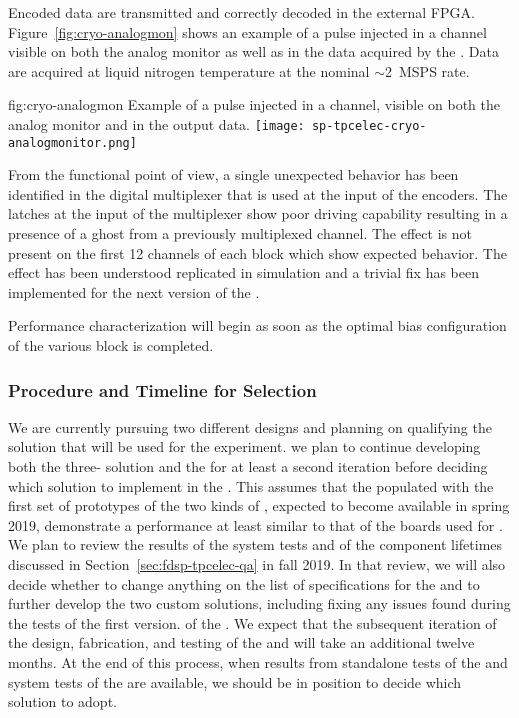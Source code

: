 Encoded data are transmitted and correctly decoded in the external FPGA. Figure~\ref{fig:cryo-analogmon} shows an example of a pulse injected in a channel visible on both the analog monitor as well as in the data acquired by the . Data are acquired at liquid nitrogen temperature at the nominal $\sim$\SI{2}{MSPS} rate.

\begin{dunefigure}
{fig:cryo-analogmon}
{Example of a pulse injected in a   channel, visible on both the analog monitor and in the output data.}
\texttt{[image: sp-tpcelec-cryo-analogmonitor.png]}
\end{dunefigure}

From the functional point of view, a single unexpected behavior has been identified in the digital multiplexer that is used at the input of the encoders. The latches at the input of the multiplexer show poor driving capability resulting in a presence of a ghost from a previously multiplexed channel. The effect is not present on the first 12 channels of each block which show expected behavior. The effect has been understood replicated in simulation and a trivial fix has been implemented for the next version of the .

Performance characterization will begin as soon as the optimal bias configuration of the various block is completed. 

\subsubsection{Procedure and Timeline for  Selection}
\label{sec:fdsp-tpcelec-design-femb-selection}

We are currently pursuing two different  designs and 
planning on qualifying the   solution that 
will be used for the  experiment.
we plan to continue developing both the three- 
solution and the   for at least a second 
iteration before deciding which  solution to 
implement in the  . This assumes that 
the  populated with the first set of prototypes of 
the two kinds of , expected to become available in 
spring 2019, demonstrate a performance at least similar to that 
of the boards used for . We plan to review the results 
of the system tests and of the component lifetimes discussed 
in Section~\ref{sec:fdsp-tpcelec-qa} in fall 2019. 
In that review, we will also decide whether to change anything on 
the list of specifications for the  and to further develop
the two custom  solutions, including fixing any 
issues found during the tests of the first version.  of the . 
We expect that the subsequent iteration
of the design, fabrication, and testing of the  and
 will take an additional twelve months. At the end 
of this process, when results from standalone tests of the
 and system tests of the  are
available, we should be in position to decide which 
solution to adopt.

